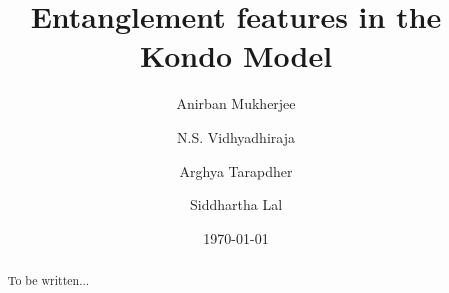 \documentclass[aps,prl,preprint,groupedaddress]{revtex4-2}
\begin{document}

\title{Entanglement features in the Kondo Model}


\author{Anirban Mukherjee}
\author{N.S. Vidhyadhiraja}
\author{Arghya Tarapdher}
\author{Siddhartha Lal}


\date{\today}

\begin{abstract}
To be written...
\end{abstract}
\end{document}

